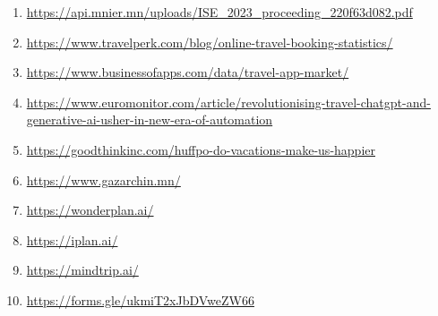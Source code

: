 



\begin{enumerate}

\item \href{https://api.mnier.mn/uploads/ISE_2023_proceeding_220f63d082.pdf}{https://api.mnier.mn/uploads/ISE_2023_proceeding_220f63d082.pdf}

\item \href{https://www.travelperk.com/blog/online-travel-booking-statistics/}{https://www.travelperk.com/blog/online-travel-booking-statistics/}

\item \href{https://www.businessofapps.com/data/travel-app-market/}{https://www.businessofapps.com/data/travel-app-market/}

\item \href{https://www.euromonitor.com/article/revolutionising-travel-chatgpt-and-generative-ai-usher-in-new-era-of-automation}{https://www.euromonitor.com/article/revolutionising-travel-chatgpt-and-generative-ai-usher-in-new-era-of-automation}

\item \href{https://goodthinkinc.com/huffpo-do-vacations-make-us-happier/}{https://goodthinkinc.com/huffpo-do-vacations-make-us-happier}

\item \href{https://www.gazarchin.mn/}{https://www.gazarchin.mn/}

\item \href{https://wonderplan.ai/}{https://wonderplan.ai/}

\item \href{https://iplan.ai/}{https://iplan.ai/}

\item \href{https://mindtrip.ai/}{https://mindtrip.ai/}

\item \href{https://forms.gle/ukmiT2xJbDVweZW66}{https://forms.gle/ukmiT2xJbDVweZW66}


\end{enumerate}
